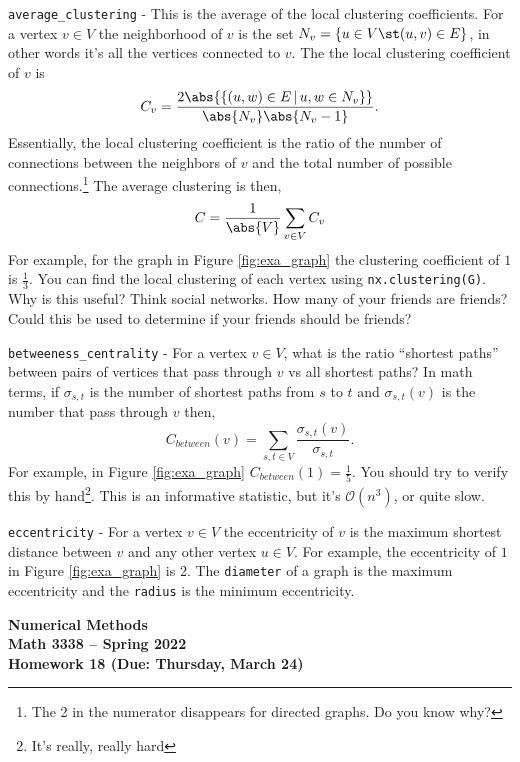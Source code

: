 \documentclass[11pt,letterpaper]{article}
\newcommand{\semester}{Spring 2022}
\newcommand{\due}{Thursday, March 24}
\begin{document}
\texttt{average\_clustering} - This is the average of the local clustering coefficients. For a vertex $v\in V$ the neighborhood of $v$ is the set $N_v = \{u\in V\st (u,v) \in E\}$, in other words it's all the vertices connected to $v$. The the local clustering coefficient of $v$ is 
\[
 C_v = \frac{2\abs{\{(u,w)\in E\, |\, u,w\in N_v\}}}{\abs{N_v}\abs{N_v-1}}.
\]
Essentially, the local clustering coefficient is the ratio of the number of connections between the neighbors of $v$ and the total number of possible connections.\footnote{The 2 in the numerator disappears for directed graphs. Do you know why?} The average clustering is then,
\[
C = \frac{1}{\abs{V}}\sum_{v\in V} C_v
\]
For example, for the graph in Figure \ref{fig:exa_graph} the clustering coefficient of $1$ is $\frac{1}{3}$. You can find the local clustering of each vertex using \texttt{nx.clustering(G)}. Why is this useful? Think social networks. How many of your friends are friends? Could this be used to determine if your friends should be friends?


\texttt{betweeness\_centrality} - For a vertex $v\in V$, what is the ratio ``shortest paths'' between pairs of vertices that pass through $v$ vs all shortest paths? In math terms, if $\sigma_{s,t}$ is the number of shortest paths from $s$ to $t$ and $\sigma_{s,t}(v)$ is the number that pass through $v$ then,
\[
C_{between}(v) = \sum_{s,t\in V} \frac{\sigma_{s,t}(v)}{\sigma_{s,t}}.
\]
For example, in Figure \ref{fig:exa_graph} $C_{between}(1) = \frac{1}{5}$. You should try to verify this by hand\footnote{It's really, really hard}. This is an informative statistic, but it's $\mathcal{O}(n^3)$, or quite slow. 


\texttt{eccentricity} - For a vertex $v\in V$ the eccentricity of $v$ is the maximum shortest distance between $v$ and any other vertex $u\in V$. For example, the eccentricity of $1$ in Figure \ref{fig:exa_graph} is 2. The \texttt{diameter} of a graph is the maximum eccentricity and the \texttt{radius} is the minimum eccentricity. 





\newpage

\begin{center}
{\huge{\bf  Numerical Methods}} \\[1.5ex]
{\bf Math 3338 -- \semester}\\[1.5ex]
{\Large{\bf Homework 18 (Due: \due)}}\\
\end{center}
\vspace{2mm}
\end{document}
